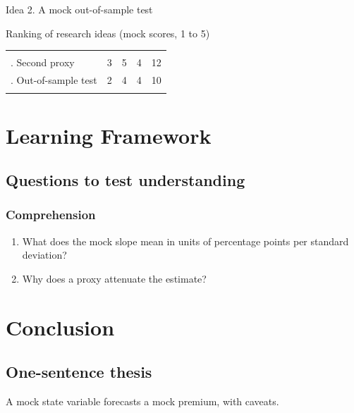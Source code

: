 \documentclass{lrreview}
\begin{document}
\begin{lridea}{Idea 2. A mock out-of-sample test}
\end{lridea}

\begin{lrtable}{Ranking of research ideas (mock scores, 1 to 5)}
\begin{tabularx}{\linewidth}{@{}L r r r r@{}}
\lrtoprule
{} &  &  &  & \\
. Second proxy & 3 & 5 & 4 & 12\\
. Out-of-sample test & 2 & 4 & 4 & 10\\
\lrbottomrule
\end{tabularx}
\end{lrtable}

\section{Learning Framework}
\subsection{Questions to test understanding}
\subsubsection{Comprehension}
\begin{enumerate}
  \item What does the mock slope mean in units of percentage points per standard deviation?
  \item Why does a proxy attenuate the estimate?
\end{enumerate}

\section{Conclusion}
\subsection{One-sentence thesis}
A mock state variable forecasts a mock premium, with caveats.
\end{document}
